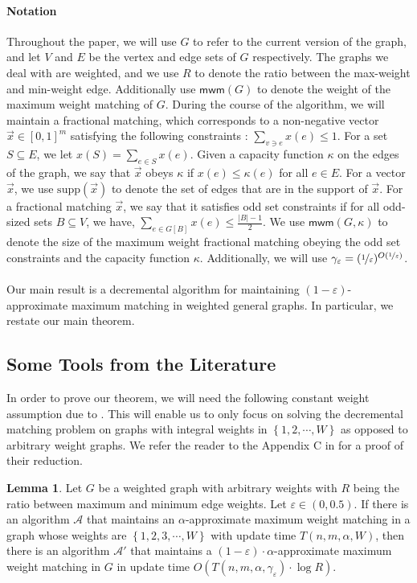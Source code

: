 \documentclass[a4paper,11pt]{article}
\newcommand{\card}[1]{|#1|}
\newcommand{\set}[1]{\ensuremath{\left\{ #1 \right\}}}
\newcommand{\eps}{\varepsilon}
\theoremstyle{definition}
\theoremstyle{definition}
\theoremstyle{definition}
\theoremstyle{definition}
\theoremstyle{definition}
\newtheorem{lemma2}[definition2]{Lemma}
\theoremstyle{definition}
\theoremstyle{definition}
\theoremstyle{definition}
\theoremstyle{definition}
\theoremstyle{definition}
\theoremstyle{definition}
\theoremstyle{definition}
\theoremstyle{definition}
\theoremstyle{definition}
\theoremstyle{definition}
\begin{document}
\paragraph{Notation} Throughout the paper, we will use $G$ to refer to the current version of the graph, and let $V$ and $E$ be the vertex and edge sets of $G$ respectively. The graphs we deal with are weighted, and we use $R$ to denote the ratio between the max-weight and min-weight edge. Additionally use $\textsf{mwm}(G)$ to denote the weight of the maximum weight matching of $G$. During the course of the algorithm, we will maintain a fractional matching, which corresponds to a non-negative vector $\vec{x}\in [0,1]^m$ satisfying the following constraints : $\sum_{v\ni e}x(e)\leqslant 1$. For a set $S\subseteq E$, we let $x(S)=\sum_{e\in S} x(e)$. Given a capacity function $\kappa $ on the edges of the graph, we say that $\vec{x}$ obeys $\kappa$ if $x(e)\leqslant \kappa(e)$ for all $e\in E$. For a vector $\vec{x}$, we use $\text{supp}(\vec{x})$ to denote the set of edges that are in the support of $\vec{x}$. For a fractional matching $\vec{x}$, we say that it satisfies odd set constraints if for all odd-sized sets $B\subseteq V$, we have, $\sum_{e\in G[B]}x(e)\leqslant \frac{\card{B}-1}{2}$.  We use $\textsf{mwm}(G,\kappa)$ to denote the size of the maximum weight fractional matching obeying the odd set constraints and the capacity function $\kappa$. Additionally, we will use $\gamma_{\eps}=(\nicefrac{1}{\eps})^{O(\nicefrac{1}{\eps})}$. \\ \\
Our main result is a decremental algorithm for maintaining $(1-\eps)$-approximate maximum matching in weighted general graphs. In particular, we restate our main theorem.

\mainthm*

\subsection*{Some Tools from the Literature}

In order to prove our theorem, we will need the following constant weight assumption due to \cite{GP13}. This will enable us to only focus on solving the decremental matching problem on graphs with integral weights in $\set{1,2,\cdots,W}$ as opposed to arbitrary weight graphs. We refer the reader to the Appendix C in \cite{BernsteinDL21} for a proof of their reduction. 

\begin{lemma2}\label{lem:guptapeng}
Let $G$ be a weighted graph with arbitrary weights with $R$ being the ratio between maximum and minimum edge weights. Let $\eps\in (0,0.5)$. If there is an algorithm $\mathcal{A}$ that maintains an $\alpha$-approximate maximum weight matching in a graph whose weights are $\set{1,2,3,\cdots, W}$ with update time $T(n,m,\alpha, W)$, then there is an algorithm $\mathcal{A}'$ that maintains a $(1-\eps)\cdot \alpha$-approximate maximum weight matching in $G$ in update time $O(T(n,m,\alpha, \gamma_{\eps})\cdot \log R)$. 
\end{lemma2}
\end{document}
